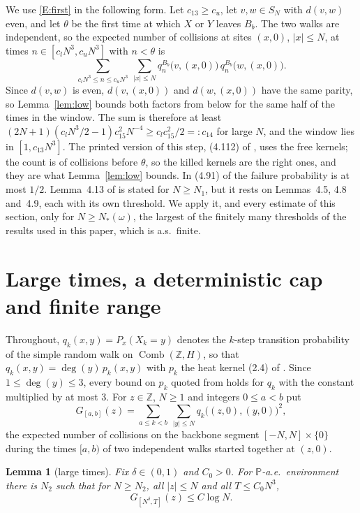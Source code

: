 \documentclass[11pt]{amsart}
\newtheorem{lemma}[theorem]{Lemma}
\theoremstyle{remark}
\numberwithin{equation}{section}
\newcommand{\Comb}{\operatorname{Comb}}
\newcommand{\PP}{\mathbb{P}}
\newcommand{\Z}{\mathbb{Z}}
\begin{document}
We use \ref{E:first} in the following form. Let $c_{13}\ge c_u$, let $v,w\in S_N$ with $d(v,w)$ even, and let $\theta$ be the first time at which $X$ or $Y$ leaves $B_b$. The two walks are independent, so the expected number of collisions at sites $(x,0)$, $|x|\le N$, at times $n\in[c_lN^3,c_uN^3]$ with $n<\theta$ is
\[
\sum_{c_lN^3\le n\le c_uN^3}\ \sum_{|x|\le N}q^{B_b}_n\bigl(v,(x,0)\bigr)\,q^{B_b}_n\bigl(w,(x,0)\bigr).
\]
Since $d(v,w)$ is even, $d(v,(x,0))$ and $d(w,(x,0))$ have the same parity, so Lemma~\ref{lem:low} bounds both factors from below for the same half of the times in the window. The sum is therefore at least $(2N+1)(c_lN^3/2-1)c_{15}^2N^{-4}\ge c_lc_{15}^2/2=:c_{14}$ for large $N$, and the window lies in $[1,c_{13}N^3]$. The printed version of this step, (4.112) of \cite{DNNS}, uses the free kernels; the count is of collisions before $\theta$, so the killed kernels are the right ones, and they are what Lemma~\ref{lem:low} bounds. In (4.91) of \cite{DNNS} the failure probability is at most $1/2$. Lemma~4.13 of \cite{DNNS} is stated for $N\ge N_1$, but it rests on Lemmas~4.5, 4.8 and~4.9, each with its own threshold. We apply it, and every estimate of this section, only for $N\ge N_*(\omega)$, the largest of the finitely many thresholds of the results used in this paper, which is a.s.\ finite.

\section{Large times, a deterministic cap and finite range}\label{sec:basic}
Throughout, $q_k(x,y)=P_x(X_k=y)$ denotes the $k$-step transition probability of the simple random walk on $\Comb(\Z,H)$, so that $q_k(x,y)=\deg(y)\,p_k(x,y)$ with $p_k$ the heat kernel (2.4) of \cite{DNNS}. Since $1\le\deg(y)\le3$, every bound on $p_k$ quoted from \cite{DNNS} holds for $q_k$ with the constant multiplied by at most $3$. For $z\in\Z$, $N\ge1$ and integers $0\le a<b$ put
\[
G_{[a,b]}(z)=\sum_{a\le k<b}\ \sum_{|y|\le N} q_k\bigl((z,0),(y,0)\bigr)^2,
\]
the expected number of collisions on the backbone segment $[-N,N]\times\{0\}$ during the times $[a,b)$ of two independent walks started together at $(z,0)$.

\begin{lemma}[large times]\label{lem:large}
Fix $\delta\in(0,1)$ and $C_0>0$. For $\PP$-a.e.\ environment there is $N_2$ such that for $N\ge N_2$, all $|z|\le N$ and all $T\le C_0N^3$,
\[
G_{[N^\delta,T]}(z)\le C\log N .
\]
\end{lemma}
\end{document}
